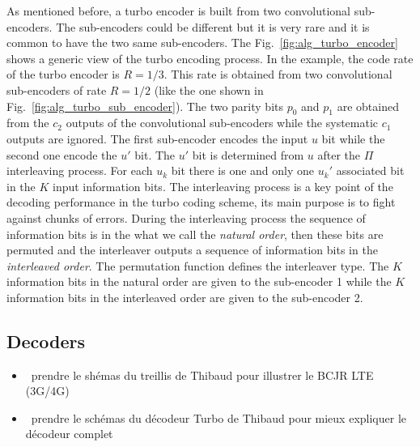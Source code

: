 As mentioned before, a turbo encoder is built from two convolutional
sub-encoders. The sub-encoders could be different but it is very rare and it is
common to have the two same sub-encoders. The Fig.~\ref{fig:alg_turbo_encoder}
shows a generic view of the turbo encoding process. In the example, the code
rate of the turbo encoder is $R = 1/3$. This rate is obtained from two
convolutional sub-encoders of rate $R = 1/2$ (like the one shown in
Fig.~\ref{fig:alg_turbo_sub_encoder}). The two parity bits $p_0$ and $p_1$ are
obtained from the $c_2$ outputs of the convolutional sub-encoders while the
systematic $c_1$ outputs are ignored. The first sub-encoder encodes the input
$u$ bit while the second one encode the $u'$ bit. The $u'$ bit is determined
from $u$ after the $\Pi$ interleaving process. For each $u_k$ bit there is one
and only one $u_k'$ associated bit in the $K$ input information bits. The
interleaving process is a key point of the decoding performance in the turbo
coding scheme, its main purpose is to fight against chunks of errors. During the
interleaving process the sequence of information bits is in the what we call the
\emph{natural order}, then these bits are permuted and the interleaver outputs a
sequence of information bits in the \emph{interleaved order}. The permutation
function defines the interleaver type. The $K$ information bits in the natural
order are given to the sub-encoder 1 while the $K$ information bits in the
interleaved order are given to the sub-encoder 2.

\subsection{Decoders}
\label{sec:turbo_overview}

\begin{itemize}
  \item \xmark~prendre le shémas du treillis de Thibaud pour illustrer le BCJR
    LTE (3G/4G)
  \item \xmark~prendre le schémas du décodeur Turbo de Thibaud pour mieux
    expliquer le décodeur complet
\end{itemize}


